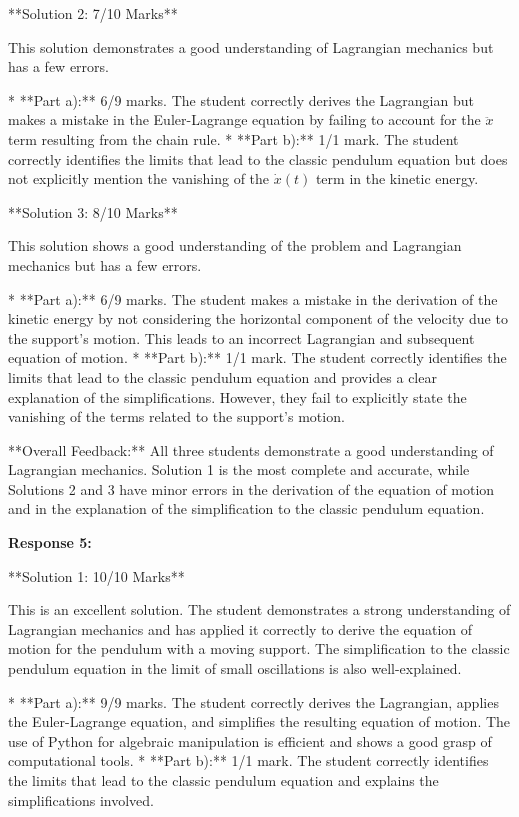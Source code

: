 \documentclass[a4paper,11pt]{article}
\begin{document}
**Solution 2: 7/10 Marks**

This solution demonstrates a good understanding of Lagrangian mechanics but has a few errors.

*   **Part a):** 6/9 marks. The student correctly derives the Lagrangian but makes a mistake in the Euler-Lagrange equation by failing to account for the \( \ddot{x} \) term resulting from the chain rule.
*   **Part b):** 1/1 mark. The student correctly identifies the limits that lead to the classic pendulum equation but does not explicitly mention the vanishing of the \( \dot{x}(t) \) term in the kinetic energy.

**Solution 3: 8/10 Marks**

This solution shows a good understanding of the problem and Lagrangian mechanics but has a few errors.

*   **Part a):** 6/9 marks. The student makes a mistake in the derivation of the kinetic energy by not considering the horizontal component of the velocity due to the support's motion. This leads to an incorrect Lagrangian and subsequent equation of motion.
*   **Part b):** 1/1 mark. The student correctly identifies the limits that lead to the classic pendulum equation and provides a clear explanation of the simplifications. However, they fail to explicitly state the vanishing of the terms related to the support's motion.

**Overall Feedback:** All three students demonstrate a good understanding of Lagrangian mechanics. Solution 1 is the most complete and accurate, while Solutions 2 and 3 have minor errors in the derivation of the equation of motion and in the explanation of the simplification to the classic pendulum equation.

\textbf{Response 5:}

**Solution 1: 10/10 Marks**

This is an excellent solution. The student demonstrates a strong understanding of Lagrangian mechanics and has applied it correctly to derive the equation of motion for the pendulum with a moving support. The simplification to the classic pendulum equation in the limit of small oscillations is also well-explained.

*   **Part a):** 9/9 marks. The student correctly derives the Lagrangian, applies the Euler-Lagrange equation, and simplifies the resulting equation of motion. The use of Python for algebraic manipulation is efficient and shows a good grasp of computational tools.
*   **Part b):** 1/1 mark. The student correctly identifies the limits that lead to the classic pendulum equation and explains the simplifications involved.
\end{document}
